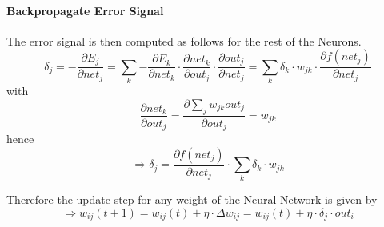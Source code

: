 \documentclass[10pt,a4paper]{article}
\begin{document}
\paragraph{Backpropagate Error Signal} The error signal is then computed as follows for the rest of the Neurons. 
$$
\delta_j = - \frac{\partial E_j}{\partial net_j}
		 = \sum_{k}{- \frac{\partial E_k}{\partial net_k} \cdot
		   \frac{\partial net_k}{\partial out_j} \cdot
		   \frac{\partial out_j}{\partial net_j}}
		 = \sum_{k}{\delta_k \cdot w_{jk} \cdot \frac{\partial f(net_j)}{\partial net_j}}
$$
with 
$$
\frac{\partial net_k}{\partial out_j} = \frac{\partial \sum_{j}{w_{jk}out_j}}{\partial out_j} = w_{jk}
$$
hence
\begin{equation}\label{err_sig_all}
\Rightarrow \boxed{\delta_j = \frac{\partial f(net_j)}{\partial net_j} \cdot \sum_{k}{\delta_k \cdot w_{jk}}}
\end{equation}

Therefore the update step for any weight of the Neural Network is given by
\begin{equation}\label{net_update}
\Rightarrow 
\boxed{ 
	w_{ij}(t+1) = w_{ij}(t) + \eta \cdot \Delta w_{ij} 
				= w_{ij}(t) + \eta \cdot \delta_j \cdot out_i 
}
\end{equation}
\end{document}
